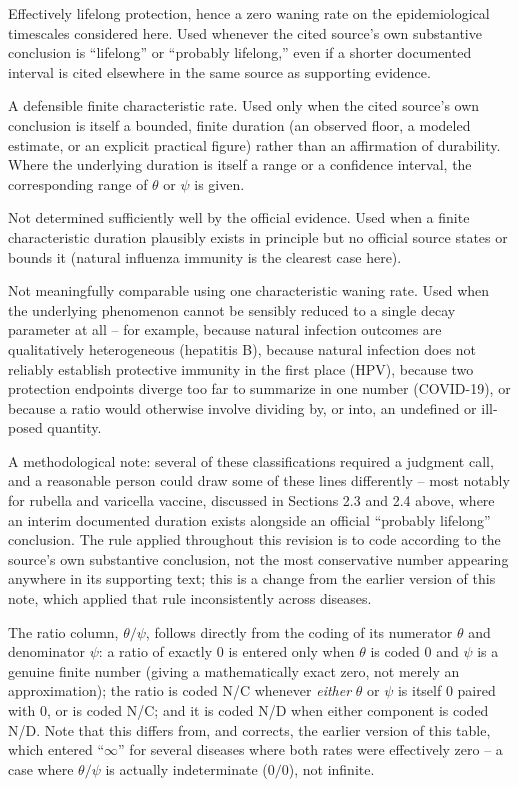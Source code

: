 \documentclass[11pt]{article}
\begin{document}
\begin{description}[leftmargin=2.2cm,style=nextline]
\item[$0$] Effectively lifelong protection, hence a zero waning rate on the
epidemiological timescales considered here. Used whenever the cited
source's own substantive conclusion is ``lifelong'' or ``probably
lifelong,'' even if a shorter documented interval is cited elsewhere in the
same source as supporting evidence.
\item[numerical value] A defensible finite characteristic rate. Used only
when the cited source's own conclusion is itself a bounded, finite
duration (an observed floor, a modeled estimate, or an explicit practical
figure) rather than an affirmation of durability. Where the underlying
duration is itself a range or a confidence interval, the corresponding
range of $\theta$ or $\psi$ is given.
\item[N/D] Not determined sufficiently well by the official evidence. Used
when a finite characteristic duration plausibly exists in principle but no
official source states or bounds it (natural influenza immunity is the
clearest case here).
\item[N/C] Not meaningfully comparable using one characteristic waning
rate. Used when the underlying phenomenon cannot be sensibly reduced to a
single decay parameter at all -- for example, because natural infection
outcomes are qualitatively heterogeneous (hepatitis B), because natural
infection does not reliably establish protective immunity in the first
place (HPV), because two protection endpoints diverge too far to summarize
in one number (COVID-19), or because a ratio would otherwise involve
dividing by, or into, an undefined or ill-posed quantity.
\end{description}

A methodological note: several of these classifications required a
judgment call, and a reasonable person could draw some of these lines
differently -- most notably for rubella and varicella vaccine, discussed in
Sections 2.3 and 2.4 above, where an interim documented duration exists
alongside an official ``probably lifelong'' conclusion. The rule applied
throughout this revision is to code according to the source's own
substantive conclusion, not the most conservative number appearing
anywhere in its supporting text; this is a change from the earlier version
of this note, which applied that rule inconsistently across diseases.

The ratio column, $\theta/\psi$, follows directly from the coding of its
numerator $\theta$ and denominator $\psi$: a ratio of exactly $0$ is entered
only when $\theta$ is coded $0$ and $\psi$ is a genuine finite number
(giving a mathematically exact zero, not merely an approximation); the
ratio is coded N/C whenever \emph{either} $\theta$ or $\psi$ is itself $0$
paired with $0$, or is coded N/C; and it is coded N/D when either component
is coded N/D. Note that this differs from, and corrects, the earlier
version of this table, which entered ``$\infty$'' for several diseases
where both rates were effectively zero -- a case where $\theta/\psi$ is
actually indeterminate ($0/0$), not infinite.
\end{document}
